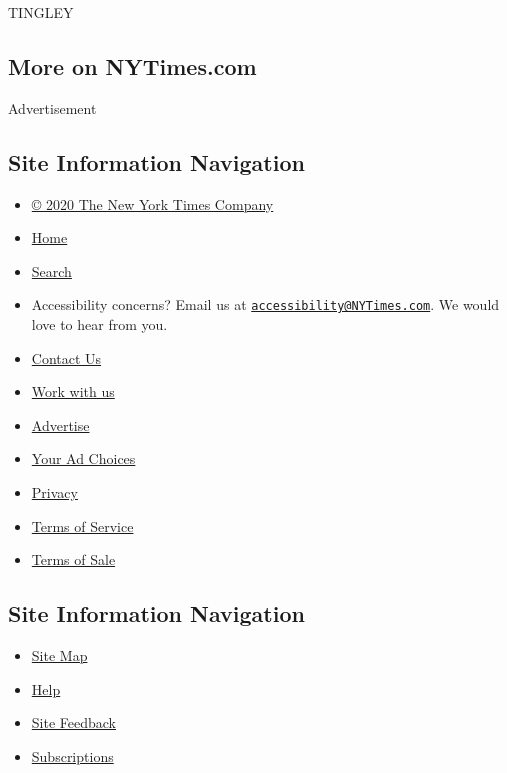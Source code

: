 TINGLEY

\hypertarget{more-on-nytimescom}{%
\subsection{More on NYTimes.com}\label{more-on-nytimescom}}

Advertisement

\hypertarget{site-information-navigation}{%
\subsection{Site Information
Navigation}\label{site-information-navigation}}

\begin{itemize}
\tightlist
\item
  \href{https://help.nytimes3xbfgragh.onion/hc/en-us/articles/115014792127-Copyright-notice}{©
  2020 The New York Times Company}
\item
  \href{https://www.nytimes3xbfgragh.onion}{Home}
\item
  \href{https://www.nytimes3xbfgragh.onion/search/}{Search}
\item
  Accessibility concerns? Email us at
  \href{mailto:accessibility@NYTimes.com}{\nolinkurl{accessibility@NYTimes.com}}.
  We would love to hear from you.
\item
  \href{https://help.nytimes3xbfgragh.onion/hc/en-us/articles/115015385887-Contact-Us}{Contact
  Us}
\item
  \href{https://www.nytco.com/careers/}{Work with us}
\item
  \href{https://nytmediakit.com/}{Advertise}
\item
  \href{https://help.nytimes3xbfgragh.onion/hc/en-us/articles/115014892108-Privacy-policy\#pp}{Your
  Ad Choices}
\item
  \href{https://help.nytimes3xbfgragh.onion/hc/en-us/articles/115014892108-Privacy-policy}{Privacy}
\item
  \href{https://help.nytimes3xbfgragh.onion/hc/en-us/articles/115014893428-Terms-of-service}{Terms
  of Service}
\item
  \href{https://help.nytimes3xbfgragh.onion/hc/en-us/articles/115014893968-Terms-of-sale}{Terms
  of Sale}
\end{itemize}

\hypertarget{site-information-navigation-1}{%
\subsection{Site Information
Navigation}\label{site-information-navigation-1}}

\begin{itemize}
\tightlist
\item
  \href{https://spiderbites.nytimes3xbfgragh.onion}{Site Map}
\item
  \href{https://help.nytimes3xbfgragh.onion/hc/en-us}{Help}
\item
  \href{https://help.nytimes3xbfgragh.onion/hc/en-us/articles/115015385887-Contact-Us?redir=myacc}{Site
  Feedback}
\item
  \href{https://www.nytimes3xbfgragh.onion/subscription?campaignId=37WXW}{Subscriptions}
\end{itemize}
